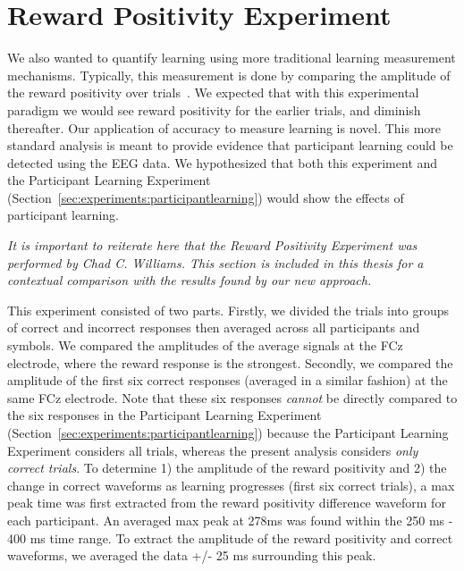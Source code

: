 \section{Reward Positivity Experiment}
\label{sec:experiments:rewpos}

We also wanted to quantify learning using more traditional learning measurement 
mechanisms. Typically, this measurement is done by comparing the amplitude of 
the reward positivity over trials~\cite{williams2017application}. We expected 
that with this experimental paradigm we would see reward positivity for the 
earlier trials, and diminish thereafter. Our application of \tvt accuracy to 
measure learning is novel.  This more standard analysis is meant to provide 
evidence that participant learning could be detected using the EEG data. We 
hypothesized that both this experiment and the Participant Learning Experiment 
(Section~\ref{sec:experiments:participantlearning}) would show the effects of 
participant learning.

\emph{It is important to reiterate here that the Reward Positivity Experiment 
was performed by Chad C. Williams. This section is included in this thesis for 
a contextual comparison with the results found by our new approach.}

This experiment consisted of two parts. Firstly, we divided the trials into 
groups of correct and incorrect responses then averaged across all participants 
and symbols. We compared the amplitudes of the average signals at the FCz 
electrode, where the reward response is the strongest. Secondly, we compared 
the amplitude of the first six correct responses (averaged in a similar 
fashion) at the same FCz electrode. Note that these six responses \emph{cannot} 
be directly compared to the six responses in the Participant Learning 
Experiment (Section~\ref{sec:experiments:participantlearning}) because the 
Participant Learning Experiment considers all trials, whereas the present 
analysis considers \emph{only correct trials}. To determine 1) the amplitude of 
the reward positivity and 2) the change in correct waveforms as learning 
progresses (first six correct trials), a max peak time was first extracted from 
the reward positivity difference waveform for each participant. An averaged max 
peak at 278ms was found within the 250 ms - 400 ms time range. To extract the 
amplitude of the reward positivity and correct waveforms, we  averaged the data 
+/- 25 ms surrounding this peak.
